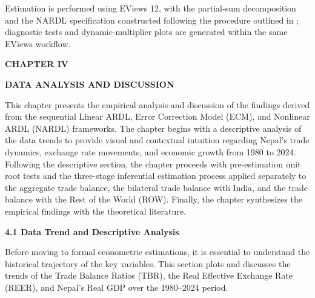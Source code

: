 \documentclass[12pt]{article}
\begin{document}
Estimation is performed using EViews 12, with the partial-sum decomposition and the NARDL specification constructed following the procedure outlined in \textcite{Shin2014-ap}; diagnostic tests and dynamic-multiplier plots are generated within the same EViews workflow.

\newpage
\begin{center}
\textbf{CHAPTER IV}
\end{center}
\begin{center}
\textbf{DATA ANALYSIS AND DISCUSSION}
\end{center}

This chapter presents the empirical analysis and discussion of the findings derived from the sequential Linear ARDL, Error Correction Model (ECM), and Nonlinear ARDL (NARDL) frameworks. The chapter begins with a descriptive analysis of the data trends to provide visual and contextual intuition regarding Nepal's trade dynamics, exchange rate movements, and economic growth from 1980 to 2024. Following the descriptive section, the chapter proceeds with pre-estimation unit root tests and the three-stage inferential estimation process applied separately to the aggregate trade balance, the bilateral trade balance with India, and the trade balance with the Rest of the World (ROW). Finally, the chapter synthesizes the empirical findings with the theoretical literature.

\vspace{0.5cm}
\noindent\textbf{4.1 Data Trend and Descriptive Analysis}

Before moving to formal econometric estimations, it is essential to understand the historical trajectory of the key variables. This section plots and discusses the trends of the Trade Balance Ratios (TBR), the Real Effective Exchange Rate (REER), and Nepal’s Real GDP over the 1980–2024 period.
\end{document}
